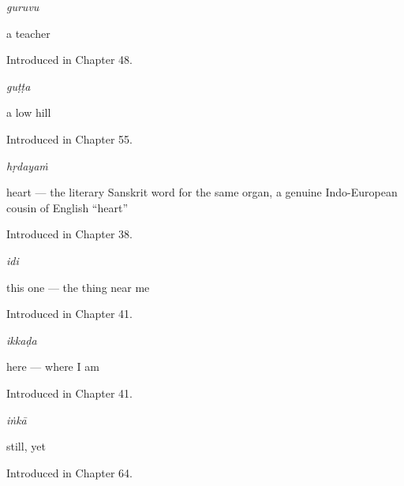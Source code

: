 \noindent\begin{minipage}[t]{\linewidth}
\raggedright
\textbf{}\enspace\emph{guruvu}\par
\small a teacher\par
\footnotesize Introduced in Chapter 48.
\end{minipage}\par\medskip

\noindent\begin{minipage}[t]{\linewidth}
\raggedright
\textbf{}\enspace\emph{guṭṭa}\par
\small a low hill\par
\footnotesize Introduced in Chapter 55.
\end{minipage}\par\medskip

\noindent\begin{minipage}[t]{\linewidth}
\raggedright
\textbf{}\enspace\emph{hṛdayaṁ}\par
\small heart — the literary Sanskrit word for the same organ, a genuine Indo-European cousin of English \textquotedblleft{}heart\textquotedblright{}\par
\footnotesize Introduced in Chapter 38.
\end{minipage}\par\medskip

\noindent\begin{minipage}[t]{\linewidth}
\raggedright
\textbf{}\enspace\emph{idi}\par
\small this one — the thing near me\par
\footnotesize Introduced in Chapter 41.
\end{minipage}\par\medskip

\noindent\begin{minipage}[t]{\linewidth}
\raggedright
\textbf{}\enspace\emph{ikkaḍa}\par
\small here — where I am\par
\footnotesize Introduced in Chapter 41.
\end{minipage}\par\medskip

\noindent\begin{minipage}[t]{\linewidth}
\raggedright
\textbf{}\enspace\emph{iṅkā}\par
\small still, yet\par
\footnotesize Introduced in Chapter 64.
\end{minipage}\par\medskip


